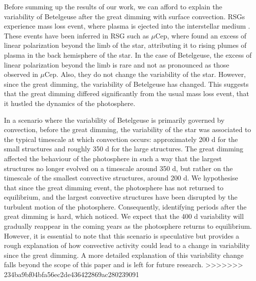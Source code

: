 \documentclass{aa}
\begin{document}
Before summing up the results of our work, we can afford to explain the variability of Betelgeuse after the great dimming with surface convection. RSGs experience mass loss event, where plasma is ejected into the interstellar medium \citep{josselin_atmospheric_2007}. These events have been inferred in RSG such as $\mu$Cep, where \cite{lopez_ariste_height_2023} found an excess of linear polarization beyond the limb of the star, attributing it to rising plumes of plasma in the back hemisphere of the star. In the case of Betelgeuse, the excess of linear polarization beyond the limb is rare and not as pronounced as those observed in $\mu$Cep. Also, they do not change the variability of the star. However, since the great dimming, the variability of Betelgeuse has changed. This suggests that the great dimming differed significantly from the usual mass loss event, that it hustled the dynamics of the photosphere. \

In a scenario where the variability of Betelgeuse is primarily governed by convection, before the great dimming, the variability of the star was associated to the typical timescale at which convection occurs: approximately 200 d for the small structures and roughly 350 d for the large structures. The great dimming affected the behaviour of the photosphere in such a way that the largest structures no longer evolved on a timescale around 350 d, but rather on the timescale of the smallest convective structures, around 200 d. We hypothesise that since the great dimming event, the photosphere has not returned to equilibrium, and the largest convective structures have been disrupted by the turbulent motion of the photosphere. Consequently, identifying periods after the great dimming is hard, which \cite{dupree_great_2022} noticed. We expect that the 400 d variability will gradually reappear in the coming years as the photosphere returns to equilibrium. However, it is essential to note that this scenario is speculative but provides a rough explanation of how convective activity could lead to a change in variability since the great dimming. A more detailed explanation of this variability change falls beyond the scope of this paper and is left for future research.
>>>>>>> 234ba9bf04bfa56ec2de436422869ac280239091
\end{document}
